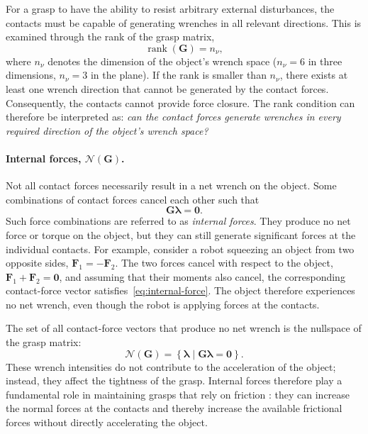 For a grasp to have the ability to resist arbitrary external disturbances,
the contacts must be capable of generating wrenches in all relevant
directions. This is examined through the rank of the grasp matrix,
\begin{equation}
    \operatorname{rank}(\boldsymbol{G}) = n_{\nu},
    \label{eq:rank-condition}
\end{equation}
where $n_{\nu}$ denotes the dimension of the object's wrench space
($n_\nu = 6$ in three dimensions, $n_\nu = 3$ in the plane). If the rank is
smaller than $n_{\nu}$, there exists at least one wrench direction that
cannot be generated by the contact forces. Consequently, the contacts cannot
provide force closure. The rank condition can therefore be interpreted as:
\emph{can the contact forces generate wrenches in every required direction
of the object's wrench space?}

\paragraph{Internal forces, $\mathcal{N}(\boldsymbol{G})$.}
Not all contact forces necessarily result in a net wrench on the object.
Some combinations of contact forces cancel each other such that
\begin{equation}
    \boldsymbol{G}\boldsymbol{\lambda} = \mathbf{0}.
    \label{eq:internal-force}
\end{equation}
Such force combinations are referred to as \textit{internal forces}. They
produce no net force or torque on the object, but they can still generate
significant forces at the individual contacts. For example, consider a robot
squeezing an object from two opposite sides, $\mathbf{F}_1 = -\mathbf{F}_2$.
The two forces cancel with respect to the object, $\mathbf{F}_1+\mathbf{F}_2
= \mathbf{0}$, and assuming that their moments also cancel, the
corresponding contact-force vector satisfies~\eqref{eq:internal-force}. The
object therefore experiences no net wrench, even though the robot is applying
forces at the contacts.

The set of all contact-force vectors that produce no net wrench is the
nullspace of the grasp matrix:
\begin{equation}
    \mathcal{N}(\boldsymbol{G})
    = \left\{
    \boldsymbol{\lambda}
    \mid
    \boldsymbol{G}\boldsymbol{\lambda}=\mathbf{0}
    \right\}.
\end{equation}
These wrench intensities do not contribute to the acceleration of the
object; instead, they affect the tightness of the grasp. Internal forces
therefore play a fundamental role in maintaining grasps that rely on
friction \cite[p.~678]{prattichizzo2008grasping}: they can increase the
normal forces at the contacts and thereby increase the available frictional
forces without directly accelerating the object.

